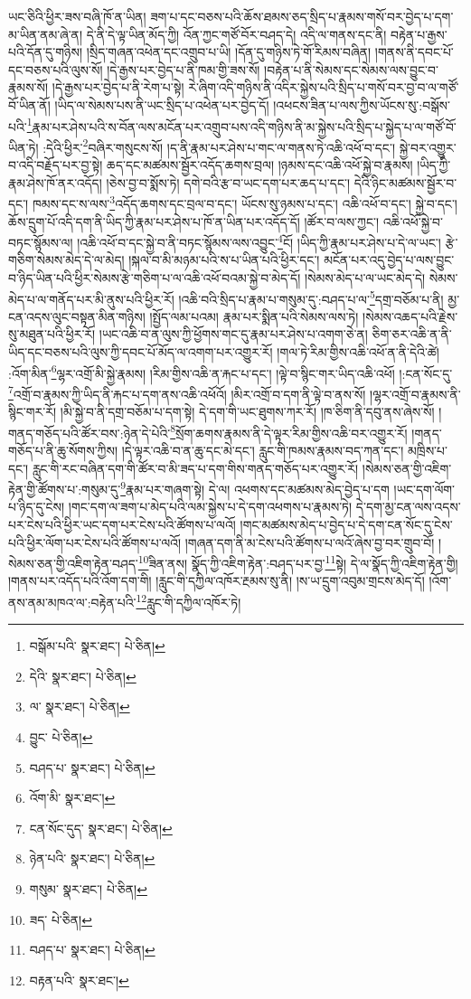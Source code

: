 ཡང་ཅིའི་ཕྱིར་ཟས་བཞི་ཁོ་ན་ཡིན། ཟག་པ་དང་བཅས་པའི་ཆོས་ཐམས་ཅད་སྲིད་པ་རྣམས་གསོ་བར་བྱེད་པ་དག་མ་ཡིན་ནམ་ཞེ་ན། དེ་ནི་དེ་ལྟ་ཡིན་མོད་ཀྱི། འོན་ཀྱང་གཙོ་བོར་བཤད་དེ། འདི་ལ་གནས་དང་ནི། བརྟེན་པ་རྒྱས་པའི་དོན་དུ་གཉིས། །སྲིད་གཞན་འཕེན་དང་འགྲུབ་པ་ཡི། །དོན་དུ་གཉིས་ཏེ་གོ་རིམས་བཞིན། །གནས་ནི་དབང་པོ་དང་བཅས་པའི་ལུས་སོ། །དེ་རྒྱས་པར་བྱེད་པ་ནི་ཁམ་གྱི་ཟས་སོ། །བརྟེན་པ་ནི་སེམས་དང་སེམས་ལས་བྱུང་བ་རྣམས་སོ། །དེ་རྒྱས་པར་བྱེད་པ་ནི་རེག་པ་སྟེ། རེ་ཞིག་འདི་གཉིས་ནི་འདིར་སྐྱེས་པའི་སྲིད་པ་གསོ་བར་བྱ་བ་ལ་གཙོ་བོ་ཡིན་ནོ། །ཡིད་ལ་སེམས་པས་ནི་ཡང་སྲིད་པ་འཕེན་པར་བྱེད་དོ། །འཕངས་ཟིན་པ་ལས་ཀྱིས་ཡོངས་སུ་:བསྒོས་པའི་\footnote{བསྒོམ་པའི་  སྣར་ཐང་།  པེ་ཅིན། }རྣམ་པར་ཤེས་པའི་ས་བོན་ལས་མངོན་པར་འགྲུབ་པས་འདི་གཉིས་ནི་མ་སྐྱེས་པའི་སྲིད་པ་སྐྱེད་པ་ལ་གཙོ་བོ་ཡིན་ཏེ། :དེའི་ཕྱིར་\footnote{དེའི་  སྣར་ཐང་།  པེ་ཅིན། }བཞིར་གསུངས་སོ། །ད་ནི་རྣམ་པར་ཤེས་པ་གང་ལ་གནས་ཏེ་འཆི་འཕོ་བ་དང་། སྐྱེ་བར་འགྱུར་བ་འདི་བརྗོད་པར་བྱ་སྟེ། ཆད་དང་མཚམས་སྦྱོར་འདོད་ཆགས་བྲལ། །ཉམས་དང་འཆི་འཕོ་སྐྱེ་བ་རྣམས། །ཡིད་ཀྱི་རྣམ་ཤེས་ཁོ་ནར་འདོད། །ཅེས་བྱ་བ་སྨོས་ཏེ། དགེ་བའི་རྩ་བ་ཡང་དག་པར་ཆད་པ་དང་། དེའི་ཉིང་མཚམས་སྦྱོར་བ་དང་། ཁམས་དང་ས་ལས་\footnote{ལ་  སྣར་ཐང་།  པེ་ཅིན། }འདོད་ཆགས་དང་བྲལ་བ་དང་། ཡོངས་སུ་ཉམས་པ་དང་། འཆི་འཕོ་བ་དང་། སྐྱེ་བ་དང་། ཆོས་དྲུག་པོ་འདི་དག་ནི་ཡིད་ཀྱི་རྣམ་པར་ཤེས་པ་ཁོ་ན་ཡིན་པར་འདོད་དོ། །ཚོར་བ་ལས་ཀྱང་། འཆི་འཕོ་སྐྱེ་བ་བཏང་སྙོམས་ལ། །འཆི་འཕོ་བ་དང་སྐྱེ་བ་ནི་བཏང་སྙོམས་ལས་འབྱུང་\footnote{བྱུང་  པེ་ཅིན། }ངོ། །ཡིད་ཀྱི་རྣམ་པར་ཤེས་པ་དེ་ལ་ཡང་། རྩེ་གཅིག་སེམས་མེད་དེ་ལ་མེད། །སྐལ་བ་མི་མཉམ་པའི་ས་པ་ཡིན་པའི་ཕྱིར་དང་། མངོན་པར་འདུ་བྱེད་པ་ལས་བྱུང་བ་ཉིད་ཡིན་པའི་ཕྱིར་སེམས་རྩེ་གཅིག་པ་ལ་འཆི་འཕོ་བའམ་སྐྱེ་བ་མེད་དོ། །སེམས་མེད་པ་ལ་ཡང་མེད་དེ། སེམས་མེད་པ་ལ་གནོད་པར་མི་ནུས་པའི་ཕྱིར་རོ། །འཆི་བའི་སྲིད་པ་རྣམ་པ་གསུམ་དུ་:བཤད་པ་ལ་\footnote{བཤད་པ་  སྣར་ཐང་།  པེ་ཅིན། }དགྲ་བཅོམ་པ་ནི། མྱ་ངན་འདས་ལུང་བསྟན་མིན་གཉིས། །སྤྱོད་ལམ་པའམ། རྣམ་པར་སྨིན་པའི་སེམས་ལས་ཏེ། །སེམས་འཆད་པའི་རྗེས་སུ་མཐུན་པའི་ཕྱིར་རོ། །ཡང་འཆི་བ་ན་ལུས་ཀྱི་ཕྱོགས་གང་དུ་རྣམ་པར་ཤེས་པ་འགག་ཅེ་ན། ཅིག་ཅར་འཆི་ན་ནི་ཡིད་དང་བཅས་པའི་ལུས་ཀྱི་དབང་པོ་མོད་ལ་འགག་པར་འགྱུར་རོ། །གལ་ཏེ་རིམ་གྱིས་འཆི་འཕོ་ན་ནི་དེའི་ཚེ། :འོག་མིན་\footnote{འོག་མི་  སྣར་ཐང་། }ལྷར་འགྲོ་མི་སྐྱེ་རྣམས། །རིམ་གྱིས་འཆི་ན་རྐང་པ་དང་། །ལྟེ་བ་སྙིང་གར་ཡིད་འཆི་འཕོ། །:ངན་སོང་དུ་\footnote{ངན་སོང་དུད་  སྣར་ཐང་།  པེ་ཅིན། }འགྲོ་བ་རྣམས་ཀྱི་ཡིད་ནི་རྐང་པ་དག་ནས་འཆི་འཕོའོ། །མིར་འགྲོ་བ་དག་ནི་ལྟེ་བ་ནས་སོ། །ལྷར་འགྲོ་བ་རྣམས་ནི་སྙིང་གར་རོ། །མི་སྐྱེ་བ་ནི་དགྲ་བཅོམ་པ་དག་སྟེ། དེ་དག་གི་ཡང་ཐུགས་ཀར་རོ། །ཁ་ཅིག་ནི་དབུ་ནས་ཞེས་སོ། །གནད་གཅོད་པའི་ཚོར་བས་:ཉེན་དེ་པེའི་\footnote{ཉེན་པའི་  སྣར་ཐང་།  པེ་ཅིན། }སྲོག་ཆགས་རྣམས་ནི་དེ་ལྟར་རིམ་གྱིས་འཆི་བར་འགྱུར་རོ། །གནད་གཅོད་པ་ནི་ཆུ་སོགས་ཀྱིས། །དེ་ལྟར་འཆི་བ་ན་ཆུ་དང་མེ་དང་། རླུང་གི་ཁམས་རྣམས་བད་ཀན་དང་། མཁྲིས་པ་དང་། རླུང་གི་རང་བཞིན་དག་གི་ཚོར་བ་མི་ཟད་པ་དག་གིས་གནད་གཅོད་པར་འགྱུར་རོ། །སེམས་ཅན་གྱི་འཇིག་རྟེན་གྱི་ཚོགས་པ་:གསུམ་དུ་\footnote{གསུམ་  སྣར་ཐང་།  པེ་ཅིན། }རྣམ་པར་གཞག་སྟེ། དེ་ལ། འཕགས་དང་མཚམས་མེད་བྱེད་པ་དག །ཡང་དག་ལོག་པ་ཉིད་དུ་ངེས། །གང་དག་ལ་ཟག་པ་མེད་པའི་ལམ་སྐྱེས་པ་དེ་དག་འཕགས་པ་རྣམས་ཏེ། དེ་དག་མྱ་ངན་ལས་འདས་པར་ངེས་པའི་ཕྱིར་ཡང་དག་པར་ངེས་པའི་ཚོགས་པ་ལའོ། །གང་མཚམས་མེད་པ་བྱེད་པ་དེ་དག་ངན་སོང་དུ་ངེས་པའི་ཕྱིར་ལོག་པར་ངེས་པའི་ཚོགས་པ་ལའོ། །གཞན་དག་ནི་མ་ངེས་པའི་ཚོགས་པ་ལའོ་ཞེས་བྱ་བར་གྲུབ་བོ། །སེམས་ཅན་གྱི་འཇིག་རྟེན་བཤད་\footnote{ཟད་  པེ་ཅིན། }ཟིན་ནས། སྣོད་ཀྱི་འཇིག་རྟེན་:བཤད་པར་བྱ་\footnote{བཤད་པ་  སྣར་ཐང་།  པེ་ཅིན། }སྟེ། དེ་ལ་སྣོད་ཀྱི་འཇིག་རྟེན་གྱི། །གནས་པར་འདོད་པའི་འོག་དག་གི། །རླུང་གི་དཀྱིལ་འཁོར་རྔམས་སུ་ནི། །ས་ཡ་དྲུག་འབུམ་གྲངས་མེད་དོ། །འོག་ནས་ནམ་མཁའ་ལ་:བརྟེན་པའི་\footnote{བརྟན་པའི་  སྣར་ཐང་། }རླུང་གི་དཀྱིལ་འཁོར་ཏེ། 
